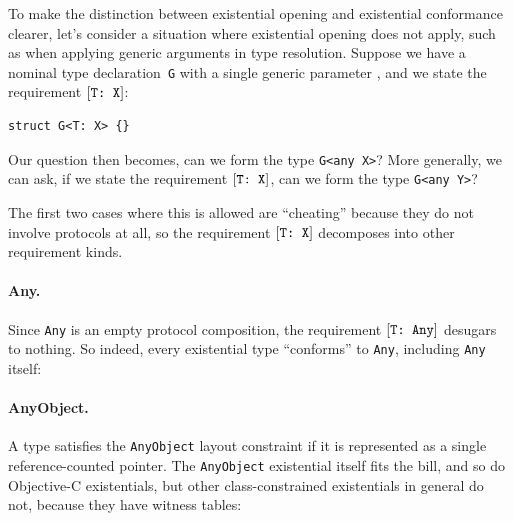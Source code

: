 \documentclass[../generics]{subfiles}
\begin{document}
To make the distinction between existential opening and existential conformance clearer, let's consider a situation where existential opening does not apply, such as when applying generic arguments in type resolution. Suppose we have a nominal type declaration~\texttt{G} with a single generic parameter \tT, and we state the requirement $[\texttt{T:~X}]$:
\begin{Verbatim}
struct G<T: X> {}
\end{Verbatim}
Our question then becomes, can we form the type \verb|G<any X>|? More generally, we can ask, if we state the requirement $[\texttt{T:~X}]$, can we form the type \verb|G<any Y>|?

The first two cases where this is allowed are ``cheating'' because they do not involve protocols at all, so the requirement $[\texttt{T:~X}]$ decomposes into other requirement kinds.

\paragraph{Any.} Since \texttt{Any} is an empty protocol composition, the requirement $[\texttt{T:~Any}]$ desugars to nothing. So indeed, every existential type ``conforms'' to \texttt{Any}, including \texttt{Any} itself:

\paragraph{AnyObject.} A type satisfies the \texttt{AnyObject} layout constraint if it is represented as a single reference-counted pointer. The \texttt{AnyObject} existential itself fits the bill, and so do Objective-C existentials, but other class-constrained existentials in general do not, because they have witness tables:
\end{document}
